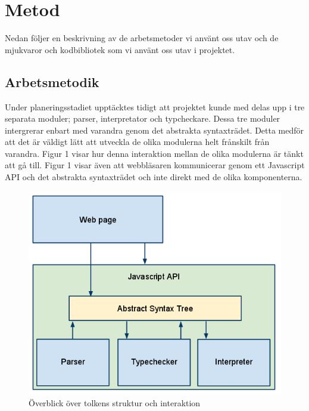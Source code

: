 \section{Metod} 

Nedan följer en beskrivning av de arbetsmetoder vi använt oss utav och de mjukvaror och kodbibliotek som vi använt oss utav i projektet. 

\subsection{Arbetsmetodik}

Under planeringsstadiet upptäcktes tidigt att projektet kunde med delas upp i tre separata moduler; parser, interpretator och typcheckare. Dessa tre moduler intergrerar enbart med varandra genom det abstrakta syntaxträdet. Detta medför att det är väldigt lätt att utveckla de olika modulerna helt frånskilt från varandra. Figur 1 visar hur denna interaktion mellan de olika modulerna är tänkt att gå till. Figur 1 visar även att webbläsaren kommunicerar genom ett Javascript API och det abstrakta syntaxträdet och inte direkt med de olika komponenterna. 

\begin{figure}[h]
    \begin{center}
        \includegraphics[width=1.0\textwidth]{image1.png}
        \caption{Överblick över tolkens struktur och interaktion}
    \end{center}
\end{figure}


